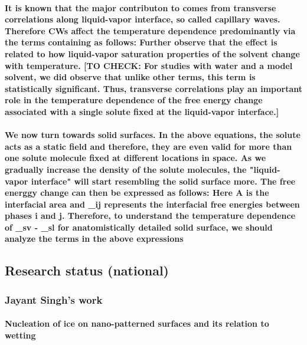\documentclass[a4paper,12pt,single,pdftex]{scrartcl}
\begin{document}
{\label{ID_1305040262}\paragraph{ It is known that the major contributon to \chi comes from transverse correlations along liquid-vapor interface, so called capillary waves. Therefore CWs affect the temperature dependence predominantly via the terms containing \chi as follows: Further observe that the effect is related to how liquid-vapor saturation properties of the solvent change with temperature. [TO CHECK: For studies with water and a model solvent, we did observe that unlike other terms, this term is statistically significant. Thus, transverse correlations play an important role in the temperature dependence of the free energy change associated with a single solute fixed at the liquid-vapor interface.]}

\label{ID_276381896}\paragraph{ We now turn towards solid surfaces. In the above equations, the solute acts as a static field and therefore, they are even valid for more than one solute molecule fixed at different locations in space. As we gradually increase the density of the solute molecules, the "liquid-vapor interface" will start  resembling the solid surface more. The free energgy change \Delta \mu can then be expressed as follows: Here A is the interfacial area and \gamma_{ij} represents the interfacial free energies between phases i and j. Therefore, to understand the temperature dependence of \gamma_{sv} - \gamma_{sl} for anatomistically detailed solid surface, we should analyze the terms in the above expressions}

\label{ID_374576713}\subsection{Research status (national)}

\label{ID_1169605654}\subsubsection{Jayant Singh's work}

\label{ID_1127102184}\paragraph{Nucleation of ice on nano-patterned surfaces and its relation to wetting}

}
\end{document}
